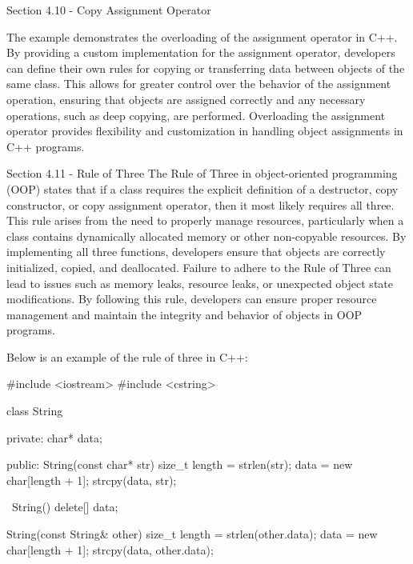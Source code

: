 \begin{notes}{Section 4.10 - Copy Assignment Operator}
\begin{highlight}
        The example demonstrates the overloading of the assignment operator in C++. By providing a custom implementation for the assignment operator, developers can define their own rules for copying or transferring data between objects of the same class. This allows for greater 
        control over the behavior of the assignment operation, ensuring that objects are assigned correctly and any necessary operations, such as deep copying, are performed. Overloading the assignment operator provides flexibility and customization in handling object assignments in C++ programs.
    \end{highlight}
\end{notes}

\begin{notes}{Section 4.11 - Rule of Three}
    The Rule of Three in object-oriented programming (OOP) states that if a class requires the explicit definition of a destructor, copy constructor, or copy assignment operator, then it most likely requires all three. This rule arises from the need to properly manage resources, 
    particularly when a class contains dynamically allocated memory or other non-copyable resources. By implementing all three functions, developers ensure that objects are correctly initialized, copied, and deallocated. Failure to adhere to the Rule of Three can lead to issues such as memory leaks, 
    resource leaks, or unexpected object state modifications. By following this rule, developers can ensure proper resource management and maintain the integrity and behavior of objects in OOP programs.
    
    \begin{highlight}
        Below is an example of the rule of three in C++:
        
    \begin{code}[C++]   
    #include <iostream>
    #include <cstring>
    
    class String {
    private:
        char* data;
    
    public:
        String(const char* str) {
            size_t length = strlen(str);
            data = new char[length + 1];
            strcpy(data, str);
        }
    
        ~String() {
            delete[] data;
        }
    
        String(const String& other) {
            size_t length = strlen(other.data);
            data = new char[length + 1];
            strcpy(data, other.data);
        }
    
}
\end{code}
\end{highlight}
\end{notes}
